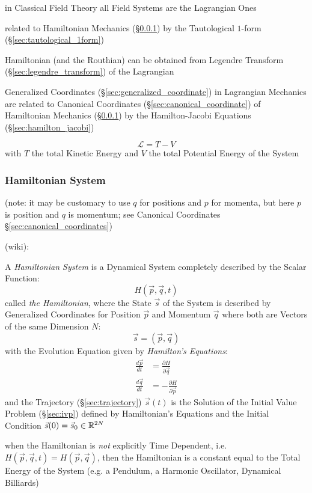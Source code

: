 in Classical Field Theory all Field Systems are the Lagrangian Ones

related to Hamiltonian Mechanics (\S\ref{sec:hamiltonian_system}) by the
Tautological $1$-form (\S\ref{sec:tautological_1form})

Hamiltonian (and the Routhian) can be obtained from Legendre Transform
(\S\ref{sec:legendre_transform}) of the Lagrangian

Generalized Coordinates (\S\ref{sec:generalized_coordinate}) in Lagrangian
Mechanics are related to Canonical Coordinates
(\S\ref{sec:canonical_coordinate}) of Hamiltonian Mechanics
(\S\ref{sec:hamiltonian_system}) by the Hamilton-Jacobi Equations
(\S\ref{sec:hamilton_jacobi})

\[
  \mathcal{L} = T - V
\]
with $T$ the total Kinetic Energy and $V$ the total Potential Energy of the
System



\subsubsection{Hamiltonian System}\label{sec:hamiltonian_system}

(note: it may be customary to use $q$ for positions and $p$ for momenta, but
here $p$ is position and $q$ is momentum; see Canonical Coordinates
\S\ref{sec:canonical_coordinates})

(wiki):

A \emph{Hamiltonian System} is a Dynamical System completely described by the
Scalar Function:
\[
  H(\vec{p},\vec{q},t)
\]
called \emph{the Hamiltonian}, where the State $\vec{s}$ of the System is
described by Generalized Coordinates for Position $\vec{p}$ and Momentum
$\vec{q}$ where both are Vectors of the same Dimension $N$:
\[
  \vec{s} = (\vec{p},\vec{q})
\]
with the Evolution Equation given by \emph{Hamilton's Equations}:
\begin{align*}
  \frac{d\vec{p}}{dt} & = \frac{\partial{H}}{\partial{\vec{q}}} \\
  \frac{d\vec{q}}{dt} & = -\frac{\partial{H}}{\partial{\vec{p}}}
\end{align*}
and the Trajectory (\S\ref{sec:trajectory}) $\vec{s}(t)$ is the Solution of
the Initial Value Problem (\S\ref{sec:ivp}) defined by Hamiltonian's Equations
and the Initial Condition $\vec{s}(0) = \vec{s}_0 \in \mathbb{R}^{2N}$

when the Hamiltonian is \emph{not} explicitly Time Dependent, i.e.
$H(\vec{p},\vec{q},t) = H(\vec{p},\vec{q})$, then the Hamiltonian is a
constant equal to the Total Energy of the System (e.g. a Pendulum, a Harmonic
Oscillator, Dynamical Billiards)

